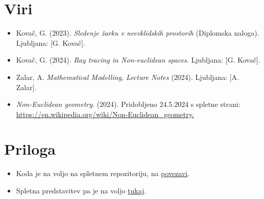\documentclass[titlepage]{article}
\begin{document}
\section{Viri}
\begin{itemize}
  \item Kovač, G. (2023). \textit{Sledenje žarku v neevklidskih prostorih} (Diplomska naloga). Ljubljana: [G. Kovač].
  \item Kovač, G. (2024). \textit{Ray tracing in Non-euclidean spaces}. Ljubljana: [G. Kovač].
  \item Zalar, A. \textit{Mathematical Modelling, Lecture Notes} (2024). Ljubljana: [A. Zalar].
  \item \textit{Non-Euclidean geometry}. (2024). Pridobljeno 24.5.2024 s spletne strani: \url{https://en.wikipedia.org/wiki/Non-Euclidean_geometry.}
\end{itemize}

\section{Priloga}
\begin{itemize}
  \item Koda je na voljo na spletnem repozitoriju, na \href{https://github.com/MAZI2/Ray-tracing-non-euclidean-spaces}{povezavi}.
  \item Spletna predstavitev pa je na voljo \href{https://docs.google.com/presentation/d/1NP8gkPzV8rE2ToBoUAP4b7w2yMkAWgCmlsRPMn_5Ahc/edit?usp=sharing}{tukaj}.
\end{itemize}
\end{document}
